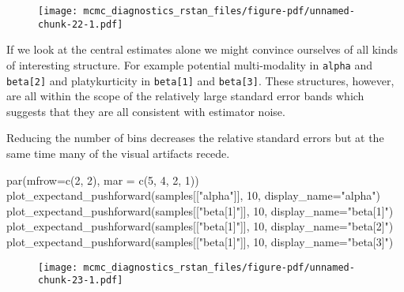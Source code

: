 \documentclass[
  letterpaper,
  DIV=11,
  numbers=noendperiod]{scrartcl}
\newenvironment{Shaded}{\begin{snugshade}}{\end{snugshade}}
\newcommand{\AttributeTok}[1]{\textcolor[rgb]{0.40,0.45,0.13}{#1}}
\newcommand{\DecValTok}[1]{\textcolor[rgb]{0.68,0.00,0.00}{#1}}
\newcommand{\FunctionTok}[1]{\textcolor[rgb]{0.28,0.35,0.67}{#1}}
\newcommand{\NormalTok}[1]{\textcolor[rgb]{0.00,0.23,0.31}{#1}}
\newcommand{\StringTok}[1]{\textcolor[rgb]{0.13,0.47,0.30}{#1}}
\begin{document}
\begin{figure}[H]

{\centering \texttt{[image: mcmc\_diagnostics\_rstan\_files/figure-pdf/unnamed-chunk-22-1.pdf]}

}

\end{figure}

If we look at the central estimates alone we might convince ourselves of
all kinds of interesting structure. For example potential multi-modality
in \texttt{alpha} and \texttt{beta{[}2{]}} and platykurticity in
\texttt{beta{[}1{]}} and \texttt{beta{[}3{]}}. These structures,
however, are all within the scope of the relatively large standard error
bands which suggests that they are all consistent with estimator noise.

Reducing the number of bins decreases the relative standard errors but
at the same time many of the visual artifacts recede.

\begin{Shaded}
\begin{Highlighting}[]
\FunctionTok{par}\NormalTok{(}\AttributeTok{mfrow=}\FunctionTok{c}\NormalTok{(}\DecValTok{2}\NormalTok{, }\DecValTok{2}\NormalTok{), }\AttributeTok{mar =} \FunctionTok{c}\NormalTok{(}\DecValTok{5}\NormalTok{, }\DecValTok{4}\NormalTok{, }\DecValTok{2}\NormalTok{, }\DecValTok{1}\NormalTok{))}
\FunctionTok{plot\_expectand\_pushforward}\NormalTok{(samples[[}\StringTok{"alpha"}\NormalTok{]], }\DecValTok{10}\NormalTok{, }\AttributeTok{display\_name=}\StringTok{"alpha"}\NormalTok{)}
\FunctionTok{plot\_expectand\_pushforward}\NormalTok{(samples[[}\StringTok{"beta[1]"}\NormalTok{]], }\DecValTok{10}\NormalTok{, }\AttributeTok{display\_name=}\StringTok{"beta[1]"}\NormalTok{)}
\FunctionTok{plot\_expectand\_pushforward}\NormalTok{(samples[[}\StringTok{"beta[1]"}\NormalTok{]], }\DecValTok{10}\NormalTok{, }\AttributeTok{display\_name=}\StringTok{"beta[2]"}\NormalTok{)}
\FunctionTok{plot\_expectand\_pushforward}\NormalTok{(samples[[}\StringTok{"beta[1]"}\NormalTok{]], }\DecValTok{10}\NormalTok{, }\AttributeTok{display\_name=}\StringTok{"beta[3]"}\NormalTok{)}
\end{Highlighting}
\end{Shaded}

\begin{figure}[H]

{\centering \texttt{[image: mcmc\_diagnostics\_rstan\_files/figure-pdf/unnamed-chunk-23-1.pdf]}

}

\end{figure}
\end{document}
